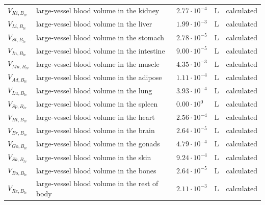 \documentclass[preprint,12pt,authoryear]{elsarticle}
\begin{document}
\begin{longtable}{P{2cm}P{3.5cm}P{2cm}P{1cm}P{2.5cm}}
$V_{Ki,B_{lv}}$ & large-vessel blood volume in the kidney & $2.77 \cdot 10^{-4}$ & $\text{L}$ &  calculated \\
$V_{Li,B_{lv}}$ & large-vessel blood volume in the liver & $1.99 \cdot 10^{-3}$ & $\text{L}$ &  calculated \\
$V_{St,B_{lv}}$ & large-vessel blood volume in the stomach & $2.78 \cdot 10^{-5}$ & $\text{L}$ &  calculated \\
$V_{In,B_{lv}}$ & large-vessel blood volume in the intestine & $9.00 \cdot 10^{-5}$ & $\text{L}$ &  calculated \\
$V_{Mu,B_{lv}}$ & large-vessel blood volume in the muscle & $4.35 \cdot 10^{-3}$ & $\text{L}$ &  calculated \\
$V_{Ad,B_{lv}}$ & large-vessel blood volume in the adipose & $1.11 \cdot 10^{-4}$ & $\text{L}$ &  calculated \\
$V_{Lu,B_{lv}}$ & large-vessel blood volume in the lung & $3.93 \cdot 10^{-4}$ & $\text{L}$ &  calculated \\
$V_{Sp,B_{lv}}$ & large-vessel blood volume in the spleen & $0.00 \cdot 10^{0}$ & $\text{L}$ &  calculated \\
$V_{Ht,B_{lv}}$ & large-vessel blood volume in the heart & $2.56 \cdot 10^{-4}$ & $\text{L}$ &  calculated \\
$V_{Br,B_{lv}}$ & large-vessel blood volume in the brain & $2.64 \cdot 10^{-5}$ & $\text{L}$ &  calculated \\
$V_{Go,B_{lv}}$ & large-vessel blood volume in the gonads & $4.79 \cdot 10^{-4}$ & $\text{L}$ &  calculated \\
$V_{Sk,B_{lv}}$ & large-vessel blood volume in the skin & $9.24 \cdot 10^{-4}$ & $\text{L}$ &  calculated \\
$V_{Bo,B_{lv}}$ & large-vessel blood volume in the bones & $2.64 \cdot 10^{-5}$ & $\text{L}$ &  calculated \\
$V_{Re,B_{lv}}$ & large-vessel blood volume in the rest of body & $2.11 \cdot 10^{-3}$ & $\text{L}$ &  calculated \\
\midrule\midrule


\end{longtable}
\end{document}
